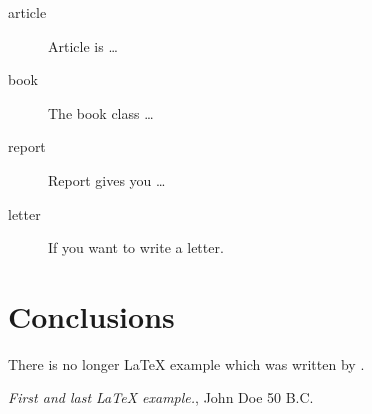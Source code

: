 \documentclass{article}
\begin{document}
			\begin{description}
				\item[article\label{article}]{Article is \ldots}
				\item[book\label{book}]{The book class \ldots}
				\item[report\label{report}]{Report gives you \ldots}
				\item[letter\label{letter}]{If you want to write a letter.}
			\end{description}
			
			
			\section{Conclusions}\label{conclusions}
			There is no longer \LaTeX{} example which was written by \cite{doe}.
			
			
			\begin{thebibliography}{9}
				 \emph{First and last \LaTeX{} example.},
				John Doe 50 B.C. 
			\end{thebibliography}
			
		
\end{document}
